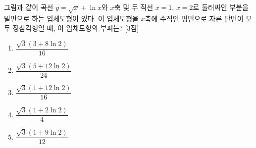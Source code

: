 
\begin{problem}
그림과 같이 곡선 $y = \sqrt{x} + \ln x$와 $x$축 및 두 직선 $x = 1$, $x = 2$로 둘러싸인 부분을 밑면으로 하는 입체도형이 있다. 이 입체도형을 $x$축에 수직인 평면으로 자른 단면이 모두 정삼각형일 때, 이 입체도형의 부피는? [3점]

\begin{enumerate}
\item $\dfrac{\sqrt{3}(3+8\ln 2)}{16}$
\item $\dfrac{\sqrt{3}(5+12\ln 2)}{24}$
\item $\dfrac{\sqrt{3}(1+12\ln 2)}{16}$
\item $\dfrac{\sqrt{3}(1+2\ln 2)}{4}$
\item $\dfrac{\sqrt{3}(1+9\ln 2)}{12}$
\end{enumerate}
\end{problem}

